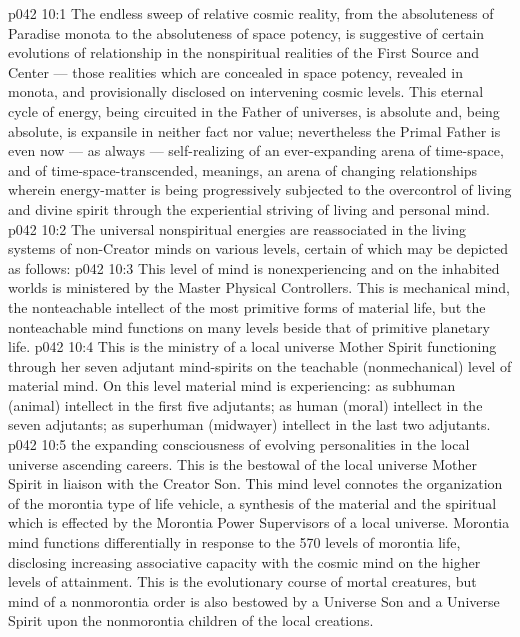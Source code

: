 \vs p042 10:1 The endless sweep of relative cosmic reality, from the absoluteness of Paradise monota to the absoluteness of space potency, is suggestive of certain evolutions of relationship in the nonspiritual realities of the First Source and Center --- those realities which are concealed in space potency, revealed in monota, and provisionally disclosed on intervening cosmic levels. This eternal cycle of energy, being circuited in the Father of universes, is absolute and, being absolute, is expansile in neither fact nor value; nevertheless the Primal Father is even now --- as always --- self\hyp{}realizing of an ever\hyp{}expanding arena of time\hyp{}space, and of time\hyp{}space\hyp{}transcended, meanings, an arena of changing relationships wherein energy\hyp{}matter is being progressively subjected to the overcontrol of living and divine spirit through the experiential striving of living and personal mind.
\vs p042 10:2 The universal nonspiritual energies are reassociated in the living systems of non\hyp{}Creator minds on various levels, certain of which may be depicted as follows:
\vs p042 10:3 \pc {}\bibnobreakspace {} This level of mind is nonexperiencing and on the inhabited worlds is ministered by the Master Physical Controllers. This is mechanical mind, the nonteachable intellect of the most primitive forms of material life, but the nonteachable mind functions on many levels beside that of primitive planetary life.
\vs p042 10:4 \pc {}\bibnobreakspace {} This is the ministry of a local universe Mother Spirit functioning through her seven adjutant mind\hyp{}spirits on the teachable (nonmechanical) level of material mind. On this level material mind is experiencing: as subhuman (animal) intellect in the first five adjutants; as human (moral) intellect in the seven adjutants; as superhuman (midwayer) intellect in the last two adjutants.
\vs p042 10:5 \pc {}\bibnobreakspace {} the expanding consciousness of evolving personalities in the local universe ascending careers. This is the bestowal of the local universe Mother Spirit in liaison with the Creator Son. This mind level connotes the organization of the morontia type of life vehicle, a synthesis of the material and the spiritual which is effected by the Morontia Power Supervisors of a local universe. Morontia mind functions differentially in response to the 570 levels of morontia life, disclosing increasing associative capacity with the cosmic mind on the higher levels of attainment. This is the evolutionary course of mortal creatures, but mind of a nonmorontia order is also bestowed by a Universe Son and a Universe Spirit upon the nonmorontia children of the local creations.
